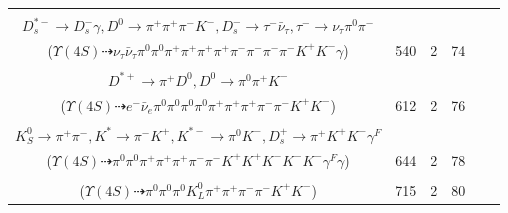 \documentclass[landscape]{article}
\newcounter{rownumbers}
\newcommand\rn{\stepcounter{rownumbers}\arabic{rownumbers}}
\newcommand{\EOLP}{\\ \hline} %
\newcommand{\topoTags}[1]{#1} %
\begin{document}
\begin{longtable}{clcccc}
\rn & \makecell[l]{ $ 
\Upsilon(4S) \rightarrow B^{0} \bar{B}^{0} ,
B^{0} \rightarrow \rho^{+} D^{-} ,
\bar{B}^{0} \rightarrow D^{*+} D_{s}^{*-} ,
\rho^{+} \rightarrow \pi^{0} \pi^{+} ,
D^{-} \rightarrow \pi^{-} \pi^{-} K^{+} ,
D^{*+} \rightarrow \pi^{+} D^{0} ,
$ \\ $
D_{s}^{*-} \rightarrow D_{s}^{-} \gamma ,
D^{0} \rightarrow \pi^{+} \pi^{+} \pi^{-} K^{-} ,
D_{s}^{-} \rightarrow \tau^{-} \bar{\nu}_{\tau} ,
\tau^{-} \rightarrow \nu_{\tau} \pi^{0} \pi^{-} 
$ \\ ($
\Upsilon(4S) \dashrightarrow \nu_{\tau} \bar{\nu}_{\tau} \pi^{0} \pi^{0} \pi^{+} \pi^{+} \pi^{+} \pi^{+} \pi^{-} \pi^{-} \pi^{-} \pi^{-} K^{+} K^{-} \gamma 
$) } & \topoTags{540 & }2 & 74 \EOLP

\rn & \makecell[l]{ $ 
\Upsilon(4S) \rightarrow B^{0} \bar{B}^{0} ,
B^{0} \rightarrow \pi^{0} \bar{D}^{0} ,
\bar{B}^{0} \rightarrow \pi^{-} \rho^{+} \rho^{-} D^{*+} ,
\bar{D}^{0} \rightarrow e^{-} \bar{\nu}_{e} K^{+} ,
\rho^{+} \rightarrow \pi^{0} \pi^{+} ,
\rho^{-} \rightarrow \pi^{0} \pi^{-} ,
$ \\ $
D^{*+} \rightarrow \pi^{+} D^{0} ,
D^{0} \rightarrow \pi^{0} \pi^{+} K^{-} 
$ \\ ($
\Upsilon(4S) \dashrightarrow e^{-} \bar{\nu}_{e} \pi^{0} \pi^{0} \pi^{0} \pi^{0} \pi^{+} \pi^{+} \pi^{+} \pi^{-} \pi^{-} K^{+} K^{-} 
$) } & \topoTags{612 & }2 & 76 \EOLP

\rn & \makecell[l]{ $ 
\Upsilon(4S) \rightarrow B^{0} \bar{B}^{0} ,
B^{0} \rightarrow K^{0} D_{s}^{-} D_{s}^{*+} ,
\bar{B}^{0} \rightarrow \pi^{0} \pi^{+} K^{-} ,
K^{0} \rightarrow K_{S}^{0} ,
D_{s}^{-} \rightarrow K^{*} K^{*-} ,
D_{s}^{*+} \rightarrow D_{s}^{+} \gamma ,
$ \\ $
K_{S}^{0} \rightarrow \pi^{+} \pi^{-} ,
K^{*} \rightarrow \pi^{-} K^{+} ,
K^{*-} \rightarrow \pi^{0} K^{-} ,
D_{s}^{+} \rightarrow \pi^{+} K^{+} K^{-} \gamma^{F} 
$ \\ ($
\Upsilon(4S) \dashrightarrow \pi^{0} \pi^{0} \pi^{+} \pi^{+} \pi^{+} \pi^{-} \pi^{-} K^{+} K^{+} K^{-} K^{-} K^{-} \gamma^{F} \gamma 
$) } & \topoTags{644 & }2 & 78 \EOLP

\rn & \makecell[l]{ $ 
\Upsilon(4S) \rightarrow B^{0} B^{0} ,
B^{0} \rightarrow K^{-} K^{*+} ,
B^{0} \rightarrow \pi^{0} \pi^{+} \pi^{+} \pi^{-} D^{-} ,
K^{*+} \rightarrow \pi^{0} K^{+} ,
D^{-} \rightarrow \pi^{0} K_{L}^{0} \pi^{-} 
$ \\ ($
\Upsilon(4S) \dashrightarrow \pi^{0} \pi^{0} \pi^{0} K_{L}^{0} \pi^{+} \pi^{+} \pi^{-} \pi^{-} K^{+} K^{-} 
$) } & \topoTags{715 & }2 & 80 \EOLP


\end{longtable}
\end{document}
